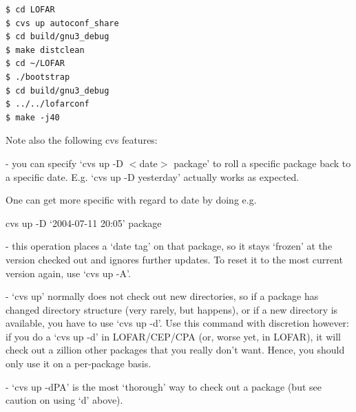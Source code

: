\documentclass[10pt]{article}
\begin{document}
\begin{verbatim}
$ cd LOFAR
$ cvs up autoconf_share
$ cd build/gnu3_debug
$ make distclean
$ cd ~/LOFAR
$ ./bootstrap
$ cd build/gnu3_debug
$ ../../lofarconf 
$ make -j40
\end{verbatim}


Note also the following cvs features:

- you can specify `cvs up -D $<$date$>$ package' to roll a specific package
back to a specific date. E.g. `cvs up -D yesterday' actually works as
expected.

One can get more specific with regard to date by doing e.g.

 cvs up -D `2004-07-11 20:05' package

- this operation places a `date tag' on that package, so it stays `frozen'
at the version checked out and ignores further updates. To reset it to the
most current version again, use `cvs up -A'.

- `cvs up' normally does not check out new directories, so if a package has
changed directory structure (very rarely, but happens), or if a new
directory is available, you have to use `cvs up -d'. Use this command with
discretion however: if you do a `cvs up -d' in LOFAR/CEP/CPA (or, worse yet,
in LOFAR), it will check out a zillion other packages that you really don't
want. Hence, you should only use it on a per-package basis.

- `cvs up -dPA' is the most `thorough' way to check out a package (but see
caution on using `d' above).
  
\end{document}
